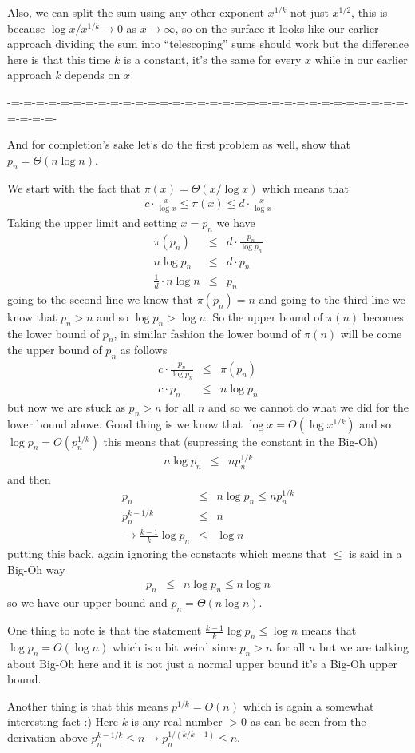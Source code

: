 \documentclass[aps,preprint,preprintnumbers,nofootinbib,showpacs,prd]{revtex4-1}
\newcommand{\nbea}{\begin{eqnarray*}}
\newcommand{\neea}{\end{eqnarray*}}
\begin{document}
Also, we can split the sum using any other exponent $x^{1/k}$ not just $x^{1/2}$, this is because $\log x/x^{1/k} \to 0$ as $x \to \infty$, so on the surface it looks like our earlier approach dividing the sum into ``telescoping'' sums should work but the difference here is that this time $k$ is a constant, it's the same for every $x$ while in our earlier approach $k$ depends on $x$

-=-=-=-=-=-=-=-=-=-=-=-=-=-=-=-=-=-=-=-=-=-=-=-=-=-=-=-=-=-=-=-=-=-=-=-=-

And for completion's sake let's do the first problem as well, show that $p_n = \Theta(n\log n)$.

We start with the fact that $\pi(x) = \Theta(x/\log x)$ which means that
%
\nbea
c\cdot \frac{x}{\log x} \le \pi(x) \le d\cdot \frac{x}{\log x}
\neea
%
Taking the upper limit and setting $x = p_n$ we have
%
\nbea
\pi(p_n) & \le & d\cdot \frac{p_n}{\log p_n} \\
n \log p_n & \le & d\cdot p_n \\
\frac{1}{d}\cdot n \log n & \le & p_n
\neea
%
going to the second line we know that $\pi(p_n) = n$ and going to the third line we know that $p_n > n$ and so $\log p_n > \log n$. So the upper bound of $\pi(n)$ becomes the lower bound of $p_n$, in similar fashion the lower bound of $\pi(n)$ will be come the upper bound of $p_n$ as follows
%
\nbea
c\cdot \frac{p_n}{\log p_n} & \le & \pi(p_n) \\
c\cdot p_n & \le & n \log p_n
\neea
%
but now we are stuck as $p_n > n$ for all $n$ and so we cannot do what we did for the lower bound above. Good thing is we know that $\log x = O(\log x^{1/k})$ and so $\log p_n = O(p_n^{1/k})$ this means that (supressing the constant in the Big-Oh)
%
\nbea
n \log p_n & \le & n p_n^{1/k}
\neea
%
and then
%
\nbea
p_n & \le & n \log p_n \le n p_n^{1/k} \\
p_n^{k-1/k} & \le & n \\
\to \frac{k-1}{k} \log p_n & \le & \log n
\neea
%
putting this back, again ignoring the constants which means that $\le$ is said in a Big-Oh way
%
\nbea
p_n & \le & n \log p_n \le n \log n
\neea
%
so we have our upper bound and $p_n = \Theta(n \log n)$.

One thing to note is that the statement $\frac{k-1}{k} \log p_n \le \log n$ means that $\log p_n = O(\log n)$ which is a bit weird since $p_n > n$ for all $n$ but we are talking about Big-Oh here and it is not just a normal upper bound it's a Big-Oh upper bound.

Another thing is that this means $p^{1/k} = O(n)$ which is again a somewhat interesting fact :) Here $k$ is any real number $> 0$ as can be seen from the derivation above $p_n^{k-1/k} \le n \to p_n^{1/(k/k-1)} \le n$.
\end{document}
